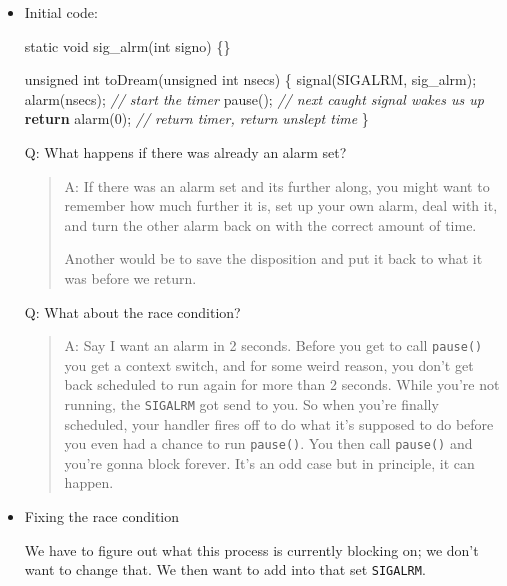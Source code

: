 \documentclass[]{article}
\newenvironment{Shaded}{}{}
\newcommand{\DataTypeTok}[1]{\textcolor[rgb]{0.56,0.13,0.00}{#1}}
\newcommand{\DecValTok}[1]{\textcolor[rgb]{0.25,0.63,0.44}{#1}}
\newcommand{\CommentTok}[1]{\textcolor[rgb]{0.38,0.63,0.69}{\textit{#1}}}
\newcommand{\ControlFlowTok}[1]{\textcolor[rgb]{0.00,0.44,0.13}{\textbf{#1}}}
\newcommand{\NormalTok}[1]{#1}
\begin{document}
\begin{itemize}
\item
  Initial code:

\begin{Shaded}
\begin{Highlighting}[]
\DataTypeTok{static} \DataTypeTok{void}\NormalTok{ sig_alrm(}\DataTypeTok{int}\NormalTok{ signo) \{\}}

\DataTypeTok{unsigned} \DataTypeTok{int}\NormalTok{ toDream(}\DataTypeTok{unsigned} \DataTypeTok{int}\NormalTok{ nsecs) \{}
\NormalTok{    signal(SIGALRM, sig_alrm);}
\NormalTok{    alarm(nsecs);		}\CommentTok{// start the timer}
\NormalTok{    pause();			}\CommentTok{// next caught signal wakes us up}
    \ControlFlowTok{return}\NormalTok{ alarm(}\DecValTok{0}\NormalTok{);	}\CommentTok{// return timer, return unslept time}
\NormalTok{\}}
\end{Highlighting}
\end{Shaded}

  Q: What happens if there was already an alarm set?

  \begin{quote}
  A: If there was an alarm set and its further along, you might want to
  remember how much further it is, set up your own alarm, deal with it,
  and turn the other alarm back on with the correct amount of time.

  Another would be to save the disposition and put it back to what it
  was before we return.
  \end{quote}

  Q: What about the race condition?

  \begin{quote}
  A: Say I want an alarm in 2 seconds. Before you get to call
  \texttt{pause()} you get a context switch, and for some weird reason,
  you don't get back scheduled to run again for more than 2 seconds.
  While you're not running, the \texttt{SIGALRM} got send to you. So
  when you're finally scheduled, your handler fires off to do what it's
  supposed to do before you even had a chance to run \texttt{pause()}.
  You then call \texttt{pause()} and you're gonna block forever. It's an
  odd case but in principle, it can happen.
  \end{quote}
\item
  Fixing the race condition

  We have to figure out what this process is currently blocking on; we
  don't want to change that. We then want to add into that set
  \texttt{SIGALRM}.


\end{itemize}
\end{document}

